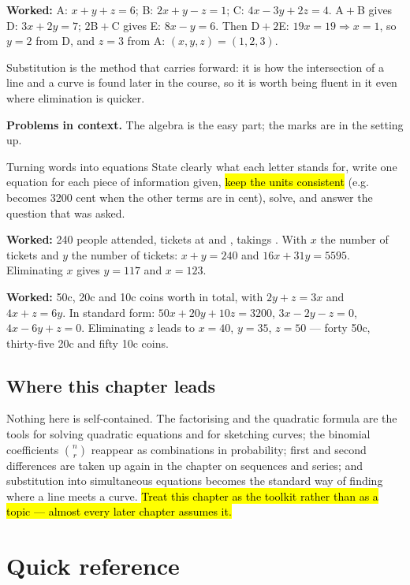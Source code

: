 \documentclass[11pt]{article}
\newcommand{\key}[1]{\hl{#1}}
\newcommand{\wex}[1]{\textbf{\color{lilacdeep}Worked:} #1}
\begin{document}
\wex{A: $x+y+z=6$; B: $2x+y-z=1$; C: $4x-3y+2z=4$. A${}+{}$B gives D: $3x+2y=7$; $2$B${}+{}$C gives E: $8x-y=6$. Then D${}+2$E: $19x=19\Rightarrow x=1$, so $y=2$ from D, and $z=3$ from A: $(x,y,z)=(1,2,3)$.}

Substitution is the method that carries forward: it is how the intersection of a line and a curve is found later in the course, so it is worth being fluent in it even where elimination is quicker.

\textbf{Problems in context.} The algebra is the easy part; the marks are in the setting up.

\begin{methodbox}{Turning words into equations}
State clearly what each letter stands for, write one equation for each piece of information given, \key{keep the units consistent} (e.g.\  becomes 3200 cent when the other terms are in cent), solve, and answer the question that was asked.
\end{methodbox}

\wex{240 people attended, tickets at  and \texteuro 16, takings \texteuro 5595. With $x$ the number of \texteuro 16 tickets and $y$ the number of \texteuro 31 tickets: $x+y=240$ and $16x+31y=5595$. Eliminating $x$ gives $y=117$ and $x=123$.}

\wex{50c, 20c and 10c coins worth  in total, with $2y+z=3x$ and $4x+z=6y$. In standard form: $50x+20y+10z=3200$, $3x-2y-z=0$, $4x-6y+z=0$. Eliminating $z$ leads to $x=40$, $y=35$, $z=50$ --- forty 50c, thirty-five 20c and fifty 10c coins.}

\subsection*{Where this chapter leads}

Nothing here is self-contained. The factorising and the quadratic formula are the tools for solving quadratic equations and for sketching curves; the binomial coefficients $\binom nr$ reappear as combinations in probability; first and second differences are taken up again in the chapter on sequences and series; and substitution into simultaneous equations becomes the standard way of finding where a line meets a curve. \key{Treat this chapter as the toolkit rather than as a topic --- almost every later chapter assumes it.}

\section*{\color{lilacdeep}Quick reference}
\end{document}
